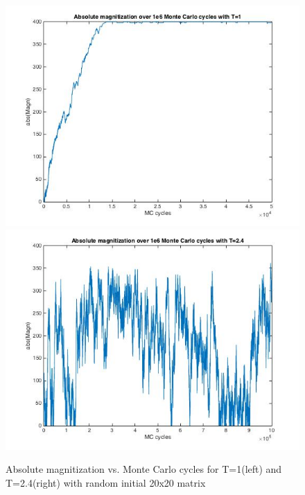 \documentclass[10pt,a4paper]{article}
\begin{document}
\begin{figure}[H]
\centerline{
\includegraphics[scale=0.4]{magnAbs20_1e6mc_T=1}
\includegraphics[scale=0.4]{magnAbs20_1e6mc_T=24}
}
\caption{Absolute magnitization vs. Monte Carlo cycles for T=1(left) and T=2.4(right) with random initial 20x20 matrix}
\label{fig:magnAbs_20_1e6}
\end{figure}
\end{document}
